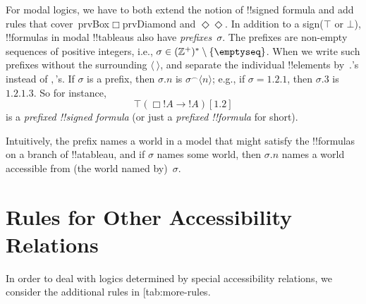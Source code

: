 \documentclass[10pt,a4paper]{article}
\makeatletter
\theoremstyle{plain}
\theoremstyle{definition}
\theoremstyle{remark}
\newcommand*{\olfileid}[3]{}
\newcommand*{\olsection}[1]{\section*{#1}}
\newcommand{\olref}{\@ifnextchar[{\olref@i}{\olref@final}}
\def\olref@i[#1]{\@ifnextchar[{\olref@ii}{\olref@final}}
\def\olref@ii[#1]{\@ifnextchar[{\olref@iii}{\olref@final}}
\def\olref@iii[#1]{\olref@final}
\def\olref@final#1{\ref{#1}}
\providecommand{\lif}{\mathbin{\rightarrow}}
\providecommand{\sFmla}[2]{#1(#2)}
\providecommand{\True}{\top}
\providecommand{\False}{\bot}
\providecommand{\tuple}[1]{\langle #1 \rangle}
\providecommand{\iftag}[1]{#1}
\providecommand{\PosInt}{\mathbb{Z}^{+}}
\providecommand{\concat}{\mathbin{{}^\frown}}
\providecommand{\iftag}{}
\makeatother
\begin{document}
For modal logics, we have to both extend the notion of !!{signed
formula} and add rules that
cover~\iftag{prvBox}{$\Box$\iftag{prvDiamond}{ and
    $\Diamond$}}{$\Diamond$}. In addition to a sign($\True$ or
$\False$), !!{formula}s in modal !!{tableau}s also have
\emph{prefixes}~$\sigma$. The prefixes are non-empty sequences of
positive integers, i.e., $\sigma \in (\PosInt)^* \setminus
\{\emptyseq\}$. When we write such prefixes without the surrounding
$\tuple{\ }$, and separate the individual !!{element}s by~$.$'s
instead of $,$'s. If $\sigma$ is a prefix, then $\sigma.n$ is $\sigma
\concat \tuple{n}$; e.g., if $\sigma = 1.2.1$, then $\sigma.3$ is
$1.2.1.3$. So for instance,
\[
\sFmla{\True}{\Box !A \lif !A}[1.2]
\]
is a \emph{prefixed !!{signed formula}} (or just a \emph{prefixed
  !!{formula}} for short).

Intuitively, the prefix names a world in a model that might satisfy
the !!{formula}s on a branch of !!a{tableau}, and if $\sigma$ names
some world, then $\sigma.n$ names a world accessible from (the world
named by)~$\sigma$.





\olfileid{nml}{tab}{mru}

\olsection{Rules for Other Accessibility Relations}

In order to deal with logics determined by special accessibility
relations, we consider the additional rules in \olref{tab:more-rules}.
\end{document}
